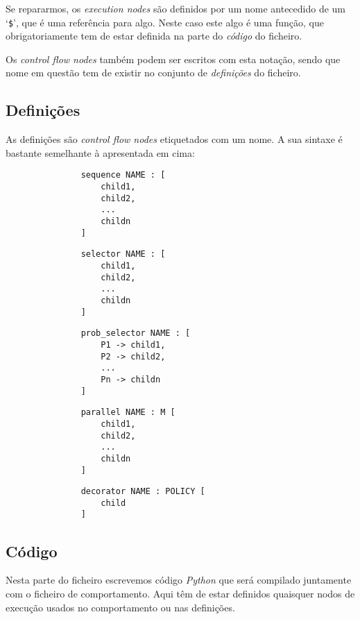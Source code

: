 Se repararmos, os \textit{execution nodes} são definidos por um nome antecedido de um `\texttt{\$}', que é uma referência para algo. Neste caso este algo é uma função, que obrigatoriamente tem de estar definida na parte do \textit{código} do ficheiro.

Os \textit{control flow nodes} também podem ser escritos com esta notação, sendo que nome em questão tem de existir no conjunto de \textit{definições} do ficheiro.

\subsection{Definições}
As definições são \textit{control flow nodes} etiquetados com um nome.
A sua sintaxe é bastante semelhante à apresentada em cima:
\begin{figure}[H]
\begin{subfigure}{0.45\linewidth}
\begin{lstlisting}
    sequence NAME : [
        child1,
        child2,
        ...
        childn
    ]
\end{lstlisting}
\end{subfigure}
\hfil
\begin{subfigure}{0.45\linewidth}
\begin{lstlisting}
    selector NAME : [
        child1,
        child2,
        ...
        childn
    ]
\end{lstlisting}
\end{subfigure}
\begin{subfigure}{0.45\linewidth}
\begin{lstlisting}
    prob_selector NAME : [
        P1 -> child1,
        P2 -> child2,
        ...
        Pn -> childn
    ]
\end{lstlisting}
\end{subfigure}
\hfil
\begin{subfigure}{0.45\linewidth}
\begin{lstlisting}
    parallel NAME : M [
        child1,
        child2,
        ...
        childn
    ]
\end{lstlisting}
\end{subfigure}
\begin{subfigure}{0.45\linewidth}
\begin{lstlisting}
    decorator NAME : POLICY [
        child
    ]
\end{lstlisting}
\end{subfigure}
\end{figure}


\subsection{Código}
Nesta parte do ficheiro escrevemos código \textit{Python} que será compilado juntamente com o ficheiro de comportamento.
Aqui têm de estar definidos quaisquer nodos de execução usados no comportamento ou nas definições.